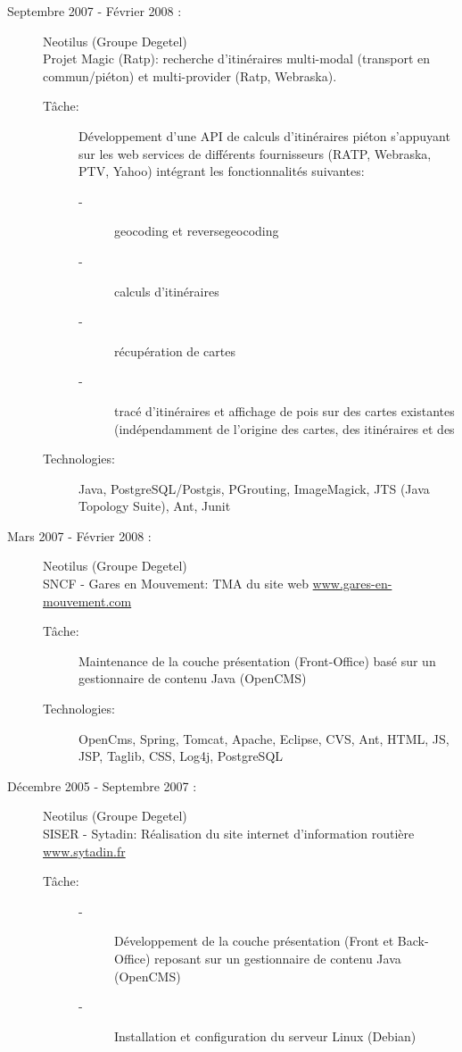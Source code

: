 \documentclass[11pt, oneside, a4paper, french]{article}
\begin{document}
\begin{description}
\item[Septembre 2007 - F\'evrier 2008 :]  Neotilus (Groupe Degetel)\\
  Projet Magic (Ratp): recherche d'itin\'eraires multi-modal (transport en commun/pi\'eton) et multi-provider (Ratp, Webraska).
  \begin{description}
  \item[T\^ache:] D\'eveloppement d'une API de calculs d'itin\'eraires pi\'eton s'appuyant sur les web services de diff\'erents fournisseurs (RATP, Webraska, PTV, Yahoo) intégrant les fonctionnalit\'es suivantes:
    \begin{description}
    \item[-] geocoding et reversegeocoding
    \item[-] calculs d'itin\'eraires
    \item[-] r\'ecup\'eration de cartes
    \item[-] trac\'e d'itin\'eraires et affichage de pois sur des cartes existantes (ind\'ependamment de l'origine des cartes, des itin\'eraires et des 
    \end{description}
    
  \item[Technologies:] Java, PostgreSQL/Postgis, PGrouting, ImageMagick, JTS (Java Topology Suite), Ant, Junit
  \end{description}
  
\item[Mars 2007 - F\'evrier 2008 :] Neotilus (Groupe Degetel)\\
  SNCF - Gares en Mouvement: TMA du site web \href{http://www.gares-en-mouvement.com}{www.gares-en-mouvement.com}
  \begin{description}
  \item[T\^ache:] Maintenance de la couche pr\'esentation (Front-Office) bas\'e sur un gestionnaire de contenu Java (OpenCMS)
    
  \item[Technologies:] OpenCms, Spring, Tomcat, Apache, Eclipse, CVS, Ant, HTML, JS, JSP, Taglib, CSS, Log4j, PostgreSQL
    
    
  \end{description}

\item[D\'ecembre 2005 - Septembre 2007 :] Neotilus (Groupe Degetel)\\
  SISER - Sytadin: R\'ealisation du site internet d'information routi\`ere \href{http://www.sytadin.fr}{www.sytadin.fr}
  \begin{description}
  \item[T\^ache:]
    \begin{description}
    \item[-] D\'eveloppement de la couche pr\'esentation (Front et Back-Office) reposant sur un gestionnaire de contenu Java (OpenCMS)
    \item[-]Installation et configuration du serveur Linux (Debian)
    \end{description}


\end{description}
\end{description}
\end{document}
